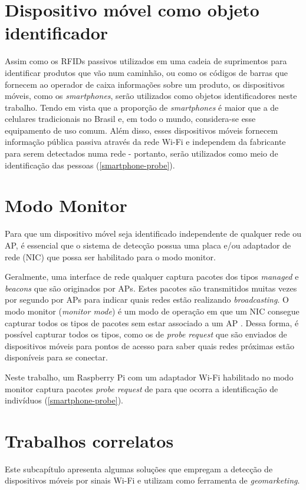 \section{Dispositivo móvel como objeto identificador}
\label{dispositivo-coisa}
Assim como os RFIDs passivos utilizados em uma cadeia de suprimentos para identificar produtos que vão num caminhão, ou como os códigos de barras
que fornecem ao operador de caixa informações sobre um produto, os dispositivos móveis, como os \emph{smartphones}, serão utilizados
como objetos identificadores neste trabalho. Tendo em vista que a proporção de \emph{smartphones} é maior que a de celulares tradicionais no Brasil e, em
todo o mundo, considera-se esse equipamento de uso comum. Além disso, esses dispositivos móveis fornecem informação pública passiva
através da rede Wi-Fi e independem da fabricante para serem detectados numa rede - portanto, serão utilizados como meio
de identificação das pessoas (\autoref{smartphone-probe}).

\section{Modo Monitor}
\label{modo-monitor}
Para que um dispositivo móvel seja identificado independente de qualquer rede ou AP, é essencial que o sistema de detecção possua uma placa e/ou adaptador de rede (NIC) que possa ser habilitado para o modo monitor.

Geralmente, uma interface de rede qualquer captura pacotes dos tipos \emph{managed} e \emph{beacons} que são originados por APs. Estes pacotes são transmitidos
muitas vezes por segundo por APs para indicar quais redes estão realizando \emph{broadcasting}. O modo monitor (\emph{monitor mode}) é um modo de operação em que um NIC consegue capturar todos os tipos de pacotes sem estar associado a um AP \cite{Acrylic} \cite{Wireshark2017b}. Dessa forma, é possível capturar todos os tipos, como os de \emph{probe request} que são enviados de dispositivos móveis para pontos de acesso para saber quais redes próximas estão disponíveis para se conectar.

Neste trabalho, um Raspberry Pi com um adaptador Wi-Fi habilitado no modo monitor captura pacotes \emph{probe request} de 
para que ocorra a identificação de indivíduos (\autoref{smartphone-probe}).

\section{Trabalhos correlatos}
\label{trabalhos-correlatos}
Este subcapítulo apresenta algumas soluções que
empregam a detecção de dispositivos móveis por sinais Wi-Fi e utilizam como ferramenta
de \emph{geomarketing}.

